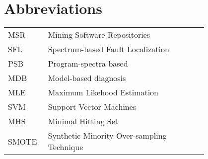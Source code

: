 \chapter*{Abbreviations}

\begin{flushleft}
\begin{tabular}{l p{0.8\linewidth}}
MSR 	& Mining Software Repositories\\
SFL 	& Spectrum-based Fault Localization \\
PSB		& Program-spectra based\\
MDB		& Model-based diagnosis\\
MLE 	& Maximum Likehood Estimation\\
SVM 	& Support Vector Machines\\
MHS		& Minimal Hitting Set\\
SMOTE	& Synthetic Minority Over-sampling Technique\\
\end{tabular}
\end{flushleft}

